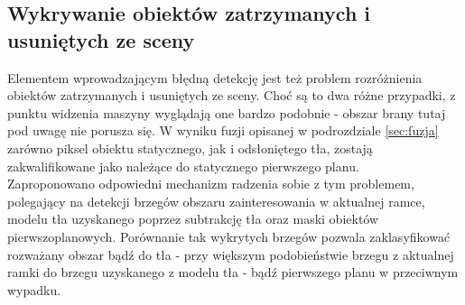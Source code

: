 \subsection{Wykrywanie obiektów zatrzymanych i usuniętych ze sceny}
Elementem wprowadzającym błędną detekcję jest też problem rozróżnienia obiektów zatrzymanych i usuniętych ze sceny. Choć są to dwa różne przypadki, z punktu widzenia maszyny wyglądają one bardzo podobnie - obszar brany tutaj pod uwagę nie porusza się. W wyniku fuzji opisanej w podrozdziale \ref{sec:fuzja} zarówno piksel obiektu statycznego, jak i odsłoniętego tła, zostają zakwalifikowane jako należące do statycznego pierwszego planu.\\
Zaproponowano odpowiedni mechanizm radzenia sobie z tym problemem, polegający na detekcji brzegów obszaru zainteresowania w aktualnej ramce, modelu tła uzyskanego poprzez subtrakcję tła oraz maski obiektów pierwszoplanowych. Porównanie tak wykrytych brzegów pozwala zaklasyfikować rozważany obszar bądź do tła - przy większym podobieństwie brzegu z aktualnej ramki do brzegu uzyskanego z modelu tła - bądź pierwszego planu w przeciwnym wypadku. 
